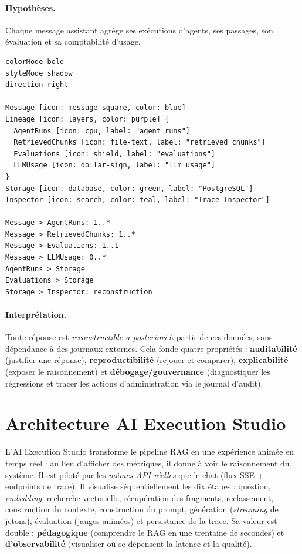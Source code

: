 \paragraph{Hypothèses.} Chaque message assistant agrège ses exécutions d'agents,
ses passages, son évaluation et sa comptabilité d'usage.

\begin{lstlisting}[style=eraser,caption={Chaîne de traçabilité (Eraser)},label={lst:trace}]
colorMode bold
styleMode shadow
direction right

Message [icon: message-square, color: blue]
Lineage [icon: layers, color: purple] {
  AgentRuns [icon: cpu, label: "agent_runs"]
  RetrievedChunks [icon: file-text, label: "retrieved_chunks"]
  Evaluations [icon: shield, label: "evaluations"]
  LLMUsage [icon: dollar-sign, label: "llm_usage"]
}
Storage [icon: database, color: green, label: "PostgreSQL"]
Inspector [icon: search, color: teal, label: "Trace Inspector"]

Message > AgentRuns: 1..*
Message > RetrievedChunks: 1..*
Message > Evaluations: 1..1
Message > LLMUsage: 0..*
AgentRuns > Storage
Evaluations > Storage
Storage > Inspector: reconstruction
\end{lstlisting}

\paragraph{Interprétation.} Toute réponse est \emph{reconstructible a posteriori}
à partir de ces données, sans dépendance à des journaux externes. Cela fonde
quatre propriétés : \textbf{auditabilité} (justifier une réponse), \textbf{reproductibilité}
(rejouer et comparer), \textbf{explicabilité} (exposer le raisonnement) et
\textbf{débogage/gouvernance} (diagnostiquer les régressions et tracer les actions
d'administration via le journal d'audit).

\section{Architecture AI Execution Studio}
L'AI Execution Studio transforme le pipeline RAG en une expérience animée en temps
réel : au lieu d'afficher des métriques, il donne à voir le raisonnement du système.
Il est piloté par les \emph{mêmes API réelles} que le chat (flux SSE + endpoints de
trace). Il visualise séquentiellement les dix étapes : question, \emph{embedding},
recherche vectorielle, récupération des fragments, reclassement, construction du
contexte, construction du prompt, génération (\emph{streaming} de jetons),
évaluation (jauges animées) et persistance de la trace. Sa valeur est double :
\textbf{pédagogique} (comprendre le RAG en une trentaine de secondes) et
\textbf{d'observabilité} (visualiser où se dépensent la latence et la qualité).


